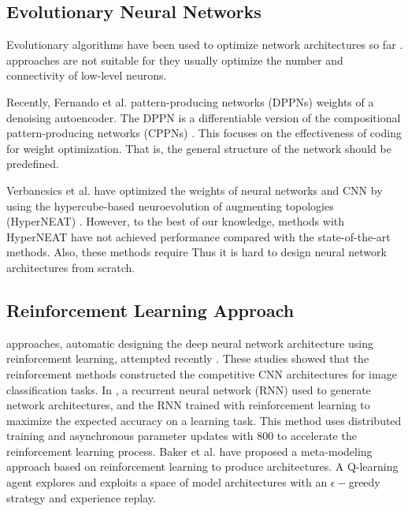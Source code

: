 \subsection{Evolutionary Neural Networks}
Evolutionary algorithms have been used to optimize  network architectures so far \cite{schaffer_combinations_1992,stanley_evolving_2002}.  approaches are not suitable for   they usually optimize the number and connectivity of low-level neurons.

Recently, Fernando et al. \cite{fernando_convolution_2016}   pattern-producing networks (DPPNs)  weights of a denoising autoencoder. The DPPN is a differentiable version of the compositional pattern-producing networks (CPPNs) \cite{stanley_compositional_2007}. This  focuses on the effectiveness of  coding for weight optimization. That is, the general structure of the network should be predefined.

Verbancsics et al. \cite{verbancsics_generative_2013,verbancsics_image_2015} have optimized the weights of  neural networks and CNN by using the hypercube-based neuroevolution of augmenting topologies (HyperNEAT) \cite{stanley_hypercube-based_2009}. However, to the best of our knowledge,  methods with HyperNEAT have not achieved  performance compared with the state-of-the-art methods. Also, these methods require  Thus\new{,} it is hard to design neural network architectures from scratch.

\subsection{Reinforcement Learning Approach}
 approaches,  automatic designing  the deep neural network architecture using reinforcement learning,  attempted recently \cite{zoph_neural_2016,baker_designing_2016}.
These studies showed that the reinforcement  methods constructed the competitive CNN architectures for image classification tasks.
In \cite{zoph_neural_2016}, a recurrent neural network (RNN)  used to generate  network architectures, and the RNN  trained with reinforcement learning to maximize the expected accuracy on a learning task.
This method uses distributed training and asynchronous parameter updates with $800$  to accelerate the reinforcement learning process.
Baker et al. \cite{baker_designing_2016} have proposed a meta-modeling approach based on reinforcement learning to produce   architectures.
A Q-learning agent explores and exploits a space of model architectures with an $\epsilon -$greedy strategy and experience replay.

